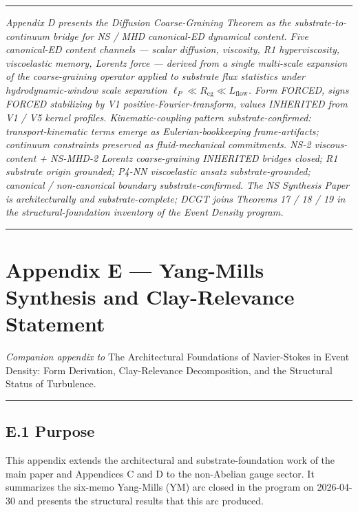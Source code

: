 \documentclass[
]{article}
\begin{document}
\begin{center}\rule{0.5\linewidth}{0.5pt}\end{center}

\emph{Appendix D presents the Diffusion Coarse-Graining Theorem as the
substrate-to-continuum bridge for NS / MHD canonical-ED dynamical
content. Five canonical-ED content channels --- scalar diffusion,
viscosity, R1 hyperviscosity, viscoelastic memory, Lorentz force ---
derived from a single multi-scale expansion of the coarse-graining
operator applied to substrate flux statistics under hydrodynamic-window
scale separation \(\ell_P \ll R_\mathrm{cg} \ll L_\mathrm{flow}\). Form
FORCED, signs FORCED stabilizing by V1 positive-Fourier-transform,
values INHERITED from V1 / V5 kernel profiles. Kinematic-coupling
pattern substrate-confirmed: transport-kinematic terms emerge as
Eulerian-bookkeeping frame-artifacts; continuum constraints preserved as
fluid-mechanical commitments. NS-2 viscous-content + NS-MHD-2 Lorentz
coarse-graining INHERITED bridges closed; R1 substrate origin grounded;
P4-NN viscoelastic ansatz substrate-grounded; canonical / non-canonical
boundary substrate-confirmed. The NS Synthesis Paper is architecturally
and substrate-complete; DCGT joins Theorems 17 / 18 / 19 in the
structural-foundation inventory of the Event Density program.}

\begin{center}\rule{0.5\linewidth}{0.5pt}\end{center}

\section{Appendix E --- Yang-Mills Synthesis and Clay-Relevance
Statement}\label{appendix-e-yang-mills-synthesis-and-clay-relevance-statement}

\emph{Companion appendix to} The Architectural Foundations of
Navier-Stokes in Event Density: Form Derivation, Clay-Relevance
Decomposition, and the Structural Status of Turbulence.

\begin{center}\rule{0.5\linewidth}{0.5pt}\end{center}

\subsection{E.1 Purpose}\label{e.1-purpose}

This appendix extends the architectural and substrate-foundation work of
the main paper and Appendices C and D to the non-Abelian gauge sector.
It summarizes the six-memo Yang-Mills (YM) arc closed in the program on
2026-04-30 and presents the structural results that this arc produced.
\end{document}
